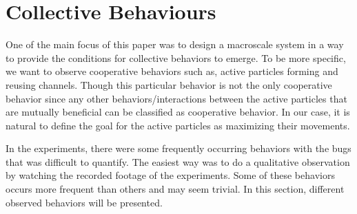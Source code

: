 

\newpage
\section{Collective Behaviours} \label{collective_behaviors}

One of the main focus of this paper was to design a macroscale system in a way to provide the conditions for 
collective behaviors to emerge. To be more specific, we want to observe cooperative behaviors such as, 
active particles forming and reusing channels. Though this particular behavior is not the only cooperative behavior 
since any other behaviors/interactions between the active particles that are mutually beneficial can 
be classified as cooperative behavior. In our case, it is natural to define the goal for the active 
particles as maximizing their movements.

In the experiments, there were some frequently occurring behaviors with the bugs that was difficult to quantify. 
The easiest way was to do a qualitative observation by watching the recorded footage of the experiments.  
Some of these behaviors occurs more frequent than others and may seem trivial. In this section, 
different observed behaviors will be presented. 

